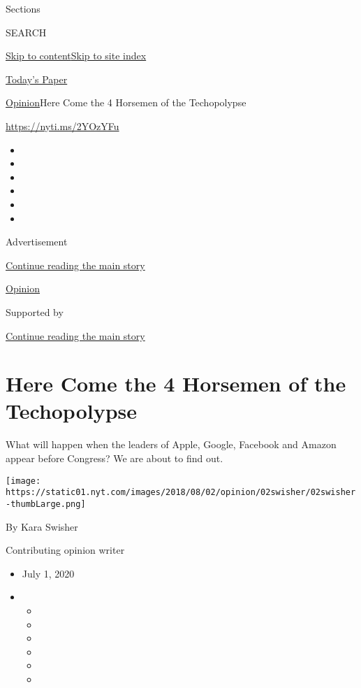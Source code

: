 Sections

SEARCH

\protect\hyperlink{site-content}{Skip to
content}\protect\hyperlink{site-index}{Skip to site index}

\href{https://myaccount.nytimes.com/auth/login?response_type=cookie\&client_id=vi}{}

\href{https://www.nytimes.com/section/todayspaper}{Today's Paper}

\href{/section/opinion}{Opinion}\textbar{}Here Come the 4 Horsemen of
the Techopolypse

\href{https://nyti.ms/2YOzYFu}{https://nyti.ms/2YOzYFu}

\begin{itemize}
\item
\item
\item
\item
\item
\item
\end{itemize}

Advertisement

\protect\hyperlink{after-top}{Continue reading the main story}

\href{/section/opinion}{Opinion}

Supported by

\protect\hyperlink{after-sponsor}{Continue reading the main story}

\hypertarget{here-come-the-4-horsemen-of-the-techopolypse}{%
\section{Here Come the 4 Horsemen of the
Techopolypse}\label{here-come-the-4-horsemen-of-the-techopolypse}}

What will happen when the leaders of Apple, Google, Facebook and Amazon
appear before Congress? We are about to find out.

\texttt{[image: https://static01.nyt.com/images/2018/08/02/opinion/02swisher/02swisher-thumbLarge.png]}

By Kara Swisher

Contributing opinion writer

\begin{itemize}
\item
  July 1, 2020
\item
  \begin{itemize}
  \item
  \item
  \item
  \item
  \item
  \item
  \end{itemize}
\end{itemize}

